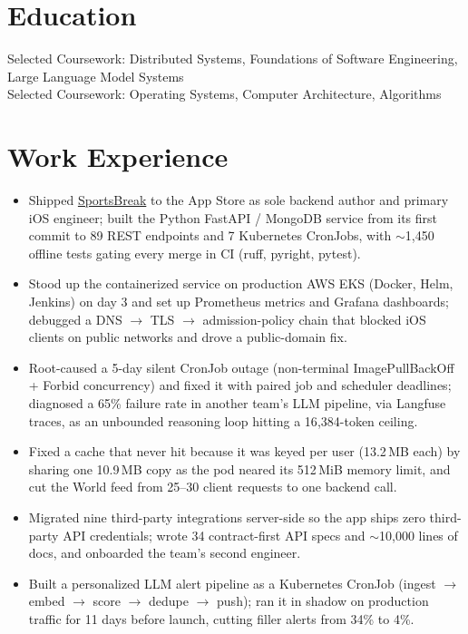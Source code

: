 \documentclass[11pt, letterpaper]{article}
\begin{document}

\section{Education}
Selected Coursework: Distributed Systems, Foundations of Software Engineering, Large Language Model Systems\\[1pt]
Selected Coursework: Operating Systems, Computer Architecture, Algorithms

\section{Work Experience}
\begin{itemize}
  \item Shipped \href{https://apps.apple.com/app/id6762649287}{SportsBreak} to the App Store as sole backend author and primary iOS engineer; built the Python FastAPI / MongoDB service from its first commit to 89 REST endpoints and 7 Kubernetes CronJobs, with $\sim$1{,}450 offline tests gating every merge in CI (ruff, pyright, pytest).
  \item Stood up the containerized service on production AWS EKS (Docker, Helm, Jenkins) on day 3 and set up Prometheus metrics and Grafana dashboards; debugged a DNS $\to$ TLS $\to$ admission-policy chain that blocked iOS clients on public networks and drove a public-domain fix.
  \item Root-caused a 5-day silent CronJob outage (non-terminal ImagePullBackOff + Forbid concurrency) and fixed it with paired job and scheduler deadlines; diagnosed a 65\% failure rate in another team's LLM pipeline, via Langfuse traces, as an unbounded reasoning loop hitting a 16{,}384-token ceiling.
  \item Fixed a cache that never hit because it was keyed per user (13.2\,MB each) by sharing one 10.9\,MB copy as the pod neared its 512\,MiB memory limit, and cut the World feed from 25--30 client requests to one backend call.
  \item Migrated nine third-party integrations server-side so the app ships zero third-party API credentials; wrote 34 contract-first API specs and $\sim$10{,}000 lines of docs, and onboarded the team's second engineer.
  \item Built a personalized LLM alert pipeline as a Kubernetes CronJob (ingest $\to$ embed $\to$ score $\to$ dedupe $\to$ push); ran it in shadow on production traffic for 11 days before launch, cutting filler alerts from 34\% to 4\%.
\end{itemize}
\end{document}
